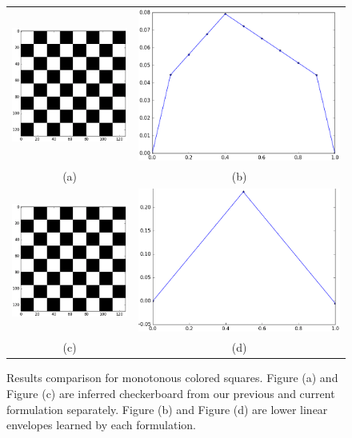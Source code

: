 \begin{figure}[ht]
  \centering
  \setlength{\tabcolsep}{2pt}
  \begin{tabular}{cc}
    \includegraphics[width=0.3\columnwidth]{Experiments/figures/mono_gt.png}&
                                                                              \includegraphics[width=0.4\columnwidth]{Experiments/figures/mono_old.png}\\
    {\small (a)} & {\small (b)} \\
    \includegraphics[width=0.3\columnwidth]{Experiments/figures/mono_gt.png}&
                                                                              \includegraphics[width=0.4\columnwidth]{Experiments/figures/mono_new.png}\\
    {\small (c)} & {\small (d)} 
  \end{tabular}
  \caption{\label{fig:mono_results} Results comparison for
    monotonous colored squares. Figure (a) and Figure (c) are
    inferred checkerboard from our previous and current
    formulation separately. Figure (b) and Figure (d) are lower
    linear envelopes learned by each formulation.}
\end{figure}

